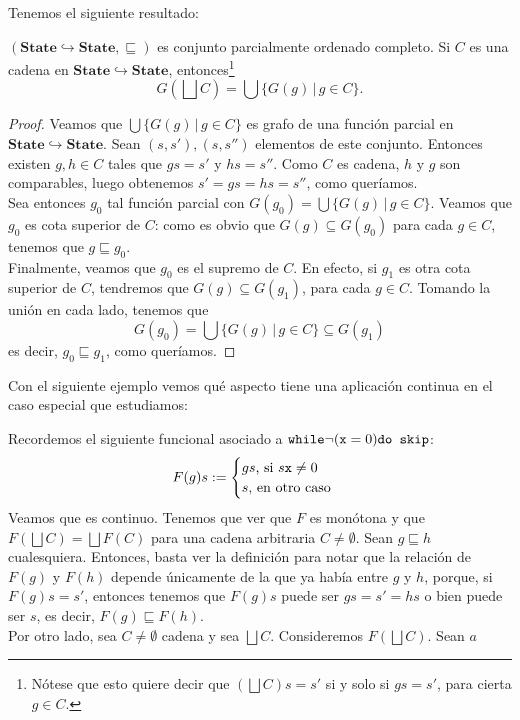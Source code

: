 Tenemos el siguiente resultado:

\begin{lema}
$(\mathbf{State}\hookrightarrow \mathbf{State}, \sqsubseteq)$ es conjunto parcialmente ordenado completo. Si $C$ es una cadena en $\mathbf{State}\hookrightarrow \mathbf{State}$, entonces\footnote{Nótese que esto quiere decir que $(\bigsqcup C)s = s'$ si y solo si $gs = s'$, para cierta $g \in C$.}
$$G\left(\bigsqcup C\right) = \bigcup\{G(g) \, | \, g \in C\}.$$
\end{lema}
\begin{proof}
Veamos que $\bigcup\{G(g) \, | \, g \in C\}$ es grafo de una función parcial en $\mathbf{State}\hookrightarrow \mathbf{State}$. Sean $(s, s'), (s, s'')$ elementos de este conjunto. Entonces existen $g, h \in C$ tales que $gs = s'$ y $hs = s''$. Como $C$ es cadena, $h$ y $g$ son comparables, luego obtenemos $s' = gs = hs = s''$, como queríamos. 
\\

Sea entonces $g_0$ tal función parcial con $G(g_0) = \bigcup\{G(g) \, | \, g \in C\}$. Veamos que $g_0$ es cota superior de $C$: como es obvio que $G(g) \subseteq G(g_0)$ para cada $g \in C$, tenemos que $g \sqsubseteq g_0$.
\\

Finalmente, veamos que $g_0$ es el supremo de $C$. En efecto, si $g_1$ es otra cota superior de $C$, tendremos que $G(g) \subseteq G(g_1)$, para cada $g \in C$. Tomando la unión en cada lado, tenemos que 
$$G(g_0) = \bigcup\{G(g) \, | \, g \in C\} \subseteq G(g_1)$$
es decir, $g_0 \sqsubseteq g_1$, como queríamos.
\end{proof}

Con el siguiente ejemplo vemos qué aspecto tiene una aplicación continua en el caso especial que estudiamos:
\begin{example}
Recordemos el siguiente funcional asociado a $\texttt{while} \neg(\texttt{x}=0)\texttt{do skip}$:
$$F(g)s := \begin{cases}
    gs \text{, si } s\texttt{x} \neq 0\\
    s \text{, en otro caso}
\end{cases}$$
Veamos que es continuo. Tenemos que ver que $F$ es monótona y que $F(\bigsqcup C) = \bigsqcup F(C)$ para una cadena arbitraria $C\neq \emptyset$. Sean $g \sqsubseteq h$ cualesquiera. Entonces, basta ver la definición para notar que la relación de $F(g)$ y $F(h)$ depende únicamente de la que ya había entre $g$ y $h$, porque, si $F(g)s = s'$, entonces tenemos que $F(g)s$ puede ser $gs = s' = hs$ o bien puede ser $s$, es decir, $F(g)\sqsubseteq F(h)$. 
\\

Por otro lado, sea $C \neq \emptyset$ cadena y sea $\bigsqcup C$. Consideremos $F(\bigsqcup C)$. Sean $a$
\end{example}

